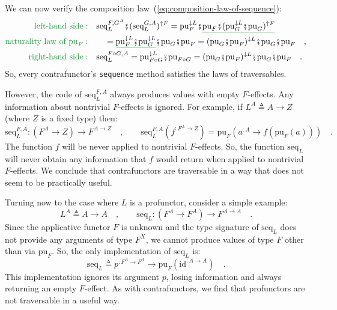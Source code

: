 We can now verify the composition law~(\ref{eq:composition-law-of-sequence}):
\begin{align*}
{\color{greenunder}\text{left-hand side}:}\quad & \text{seq}_{L}^{F,G^{A}}\bef(\text{seq}_{L}^{G,A})^{\uparrow F}=\text{pu}_{F}^{\downarrow L}\bef\gunderline{\text{pu}_{F}\bef(\text{pu}_{G}^{\downarrow L}\bef\text{pu}_{G})^{\uparrow F}}\\
{\color{greenunder}\text{naturality law of }\text{pu}_{F}:}\quad & \quad=\gunderline{\text{pu}_{F}^{\downarrow L}\bef\text{pu}_{G}^{\downarrow L}}\bef\text{pu}_{G}\bef\text{pu}_{F}=(\text{pu}_{G}\bef\text{pu}_{F})^{\downarrow L}\bef\text{pu}_{G}\bef\text{pu}_{F}\quad,\\
{\color{greenunder}\text{right-hand side}:}\quad & \text{seq}_{L}^{F\circ G,A}=\text{pu}_{F\circ G}^{\downarrow L}\bef\text{pu}_{F\circ G}=(\text{pu}_{G}\bef\text{pu}_{F})^{\downarrow L}\bef\text{pu}_{G}\bef\text{pu}_{F}\quad.
\end{align*}
So, every contrafunctor\textsf{'}s \lstinline!sequence! method satisfies the
laws of traversables.

However, the code of $\text{seq}_{L}^{F,A}$ always produces values
with empty $F$-effects. Any information about nontrivial $F$-effects
is ignored. For example, if $L^{A}\triangleq A\rightarrow Z$ (where
$Z$ is a fixed type) then:
\[
\text{seq}_{L}^{F,A}:(F^{A}\rightarrow Z)\rightarrow F^{A\rightarrow Z}\quad,\quad\quad\text{seq}_{L}^{F,A}(f^{:F^{A}\rightarrow Z})=\text{pu}_{F}(a^{:A}\rightarrow f(\text{pu}_{F}(a)))\quad.
\]
The function $f$ will be never applied to nontrivial $F$-effects.
So, the function $\text{seq}_{L}$ will never obtain any information
that $f$ would return when applied to nontrivial $F$-effects. We
conclude that contrafunctors are traversable in a way that does not
seem to be practically useful.

Turning now to the case where $L$ is a profunctor, consider a simple
example:
\[
L^{A}\triangleq A\rightarrow A\quad,\quad\quad\text{seq}_{L}:(F^{A}\rightarrow F^{A})\rightarrow F^{A\rightarrow A}\quad.
\]
Since the applicative functor $F$ is unknown and the type signature
of $\text{seq}_{L}$ does not provide any arguments of type $F^{X}$,
we cannot produce values of type $F$ other than via $\text{pu}_{F}$.
So, the only implementation of $\text{seq}_{L}$ is:
\[
\text{seq}_{L}\triangleq p^{:F^{A}\rightarrow F^{A}}\rightarrow\text{pu}_{F}(\text{id}^{:A\rightarrow A})\quad.
\]
This implementation ignores its argument $p$, losing information
and always returning an empty $F$-effect. As with contrafunctors,
we find that profunctors are not traversable in a useful way.


